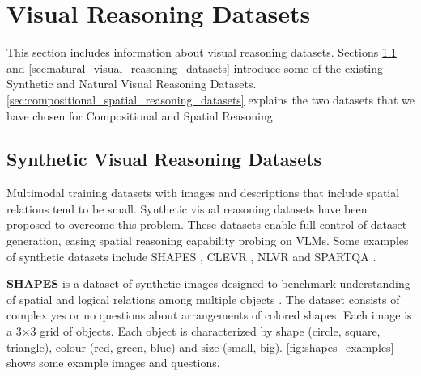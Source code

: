 \section{Visual Reasoning Datasets} \label{sec:visual_reasoning_datasets}

This section includes information about visual reasoning datasets. Sections \ref{sec:synthetic_visual_reasoning_datasets} and \ref{sec:natural_visual_reasoning_datasets} introduce some of the existing Synthetic and Natural Visual Reasoning Datasets. \cref{sec:compositional_spatial_reasoning_datasets} explains the two datasets that we have chosen for Compositional and Spatial Reasoning.

\subsection{Synthetic Visual Reasoning Datasets} \label{sec:synthetic_visual_reasoning_datasets}

Multimodal training datasets with images and descriptions that include spatial relations tend to be small. Synthetic visual reasoning datasets have been proposed to overcome this problem. These datasets enable full control of dataset generation, easing spatial reasoning capability probing  on VLMs. Some examples of synthetic datasets include SHAPES \cite{andreas2016neural}, CLEVR \cite{johnson2017clevr}, NLVR \cite{suhr-etal-2017-corpus} and SPARTQA \cite{mirzaee-etal-2021-spartqa}.

\textbf{SHAPES} is a dataset of synthetic images designed to benchmark understanding of spatial and logical relations among multiple objects \cite{andreas2016neural}. The dataset consists of complex yes or no questions about arrangements of colored shapes. Each image is a 3×3 grid of objects. Each object is characterized by shape (circle, square, triangle), colour (red, green, blue) and size (small, big). \cref{fig:shapes_examples} shows some example images and questions.

